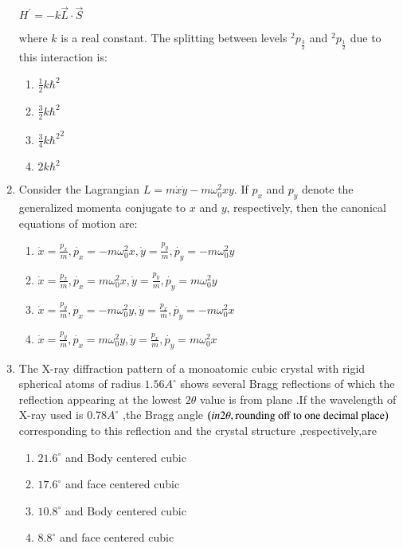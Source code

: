 \documentclass[journal]{IEEEtran}
\begin{document}
\begin{enumerate}
\begin{center}
 $H^{\prime} = -k\overrightarrow{L}\cdot\overrightarrow{S} $  
\end{center}
where $k$  is a real constant. The splitting between levels $^2p_{\frac{3}{2}}$ and $^2p_{\frac{1}{2}}$ due to this interaction is:
\begin{enumerate}
	\item $\frac{1}{2}k{\hbar}^2$ 
	\item $\frac{3}{2}k{\hbar}^2$ 
	\item $\frac{3}{4}k{\hbar^2}^2$ 
	\item $2k{\hbar}^2$
\end{enumerate}
\item Consider the Lagrangian $L=m\dot{x}\dot{y}-m\omega_0^2xy$. If $p_x$ and $p_y$ denote the generalized momenta conjugate to $x$ and $y$, respectively, then the canonical equations of motion are:
\begin{enumerate}
\item $\dot{x}=\frac{p_x}{m},\dot{p_x}=-m\omega_0^2x,\dot{y}=\frac{p_y}{m},\dot{p_y}=-m\omega_0^2y$
\item $\dot{x} = \frac{p_x}{m},\dot{p_x}=m\omega_0^2x,\dot{y}=\frac{p_y}{m},\dot{p_y}=m\omega_0^2y$
\item $\dot{x}=\frac{p_y}{m},\dot{p_x}=-m\omega_0^2 y,\dot{y}=\frac{p_x}{m},\dot{p_y}=-m\omega_0^2x$
\item $\dot{x}=\frac{p_y}{m},\dot{p_x}=m\omega_0^2y,\dot{y}=\frac{p_x}{m},\dot{p_y}=m\omega_0^2 x$
\end{enumerate}
\item The X-ray diffraction pattern of a monoatomic cubic crystal with rigid spherical atoms of radius $1.56A^{\circ}$ shows several Bragg reflections of which the reflection appearing at the lowest $2\theta$ value is from  plane .If the wavelength of X-ray used is $0.78A^{\circ}$ ,the Bragg angle $\left(in 2\theta , \text{rounding off to one decimal place}\right)$ corresponding to this reflection and the crystal structure ,respectively,are
\begin{enumerate}
\item $21.6^{\circ}$ and Body centered cubic
\item $17.6^{\circ}$ and face centered cubic
\item $10.8^{\circ}$ and Body centered cubic
\item $8.8^{\circ}$ and face centered cubic
\end{enumerate}
\end{enumerate}
\end{document}
